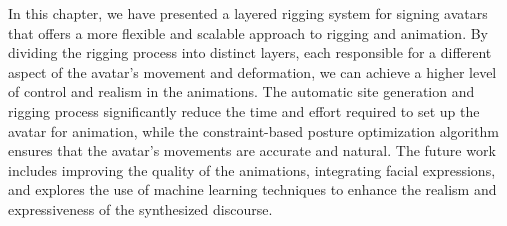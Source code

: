 \documentclass[../../main.tex]{subfiles}
\begin{document}
In this chapter, we have presented a layered rigging system for signing avatars that offers a more flexible and scalable approach to rigging and animation. By dividing the rigging process into distinct layers, each responsible for a different aspect of the avatar's movement and deformation, we can achieve a higher level of control and realism in the animations. The automatic site generation and rigging process significantly reduce the time and effort required to set up the avatar for animation, while the constraint-based posture optimization algorithm ensures that the avatar's movements are accurate and natural. The future work includes improving the quality of the animations, integrating facial expressions, and explores the use of machine learning techniques to enhance the realism and expressiveness of the synthesized discourse.
\end{document}
